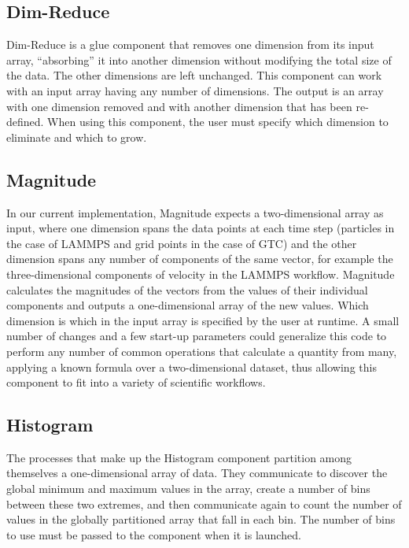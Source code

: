 \subsection{Dim-Reduce}

Dim-Reduce is a glue component that removes one dimension from its
input array, ``absorbing'' it into another dimension without modifying the
total size of the data. The other dimensions are left unchanged. This component
can work with an input array having any number of dimensions. The output is an
array with one dimension removed and with another dimension that has been
re-defined. When using this component, the user must specify which
dimension to eliminate and which to grow.

\subsection{Magnitude}

In our current implementation, Magnitude expects a two-dimensional array as
input, where one dimension spans the data points at each time step (particles
in the case of LAMMPS and grid points in the case of GTC) and the other
dimension spans any number of components of the same vector, for example the
three-dimensional components of velocity in the LAMMPS workflow. Magnitude
calculates the magnitudes of the vectors from the values of their
individual components and outputs
a one-dimensional array of the new values. Which dimension is which in the input
array is specified by the user at runtime. A small number of changes and a few
start-up parameters could generalize this code to perform any number of
common operations that calculate a quantity from many,
applying a known formula over a two-dimensional dataset, thus
allowing this component to fit into a variety of scientific workflows.

\subsection{Histogram}

The processes that make up the Histogram component
partition among themselves a one-dimensional
array of data. They communicate to discover the global
minimum and maximum values in the array, create a
number of bins between these two extremes, and
then communicate again to count the number of values in the
globally partitioned array that fall in each bin.
The number of bins to use must be passed to the
component when it is launched.

